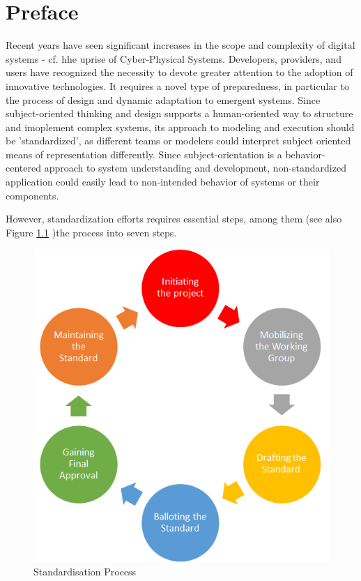 
\chapter{Preface}

Recent years have seen significant increases in the scope and complexity of digital systems - cf. hhe uprise of Cyber-Physical Systems. Developers, providers, and users have recognized the necessity to devote greater attention to the adoption of innovative technologies. It requires a novel type of preparedness, in particular to the process of design and dynamic adaptation to emergent systems. Since subject-oriented thinking and design supports a human-oriented way to structure and imoplement complex systems, its approach to modeling and execution should be 'standardized', as different teams or modelers could interpret subject oriented means of representation differently. Since subject-orientation is a behavior-centered approach to system understanding and development, non-standardized application could easily lead to non-intended behavior of systems or their components.

However, standardization efforts requires essential steps, among them (see also Figure \ref{fig:Standardisation_Process} )the process into seven steps.


\begin{figure}[h]
	\centering
	\includegraphics[width=0.7\linewidth]{Figures/Preface}
	\caption[Standardisation Process]{Standardisation Process}
	\label{fig:Standardisation_Process}
\end{figure}


